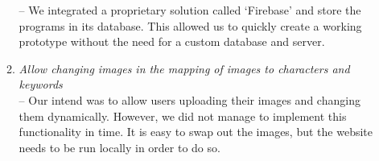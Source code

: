 \begin{enumerate}
\begin{enumerate}[label=(\alph*)]
     -- We integrated a proprietary solution called `Firebase' and store the programs in its database. This allowed us to quickly create a working
     prototype without the need for a custom database and server.
	 \item \textit{Allow changing images in the mapping of images to characters and keywords} \\
     -- Our intend was to allow users uploading their images and changing them dynamically. However, we did not manage to implement this functionality
     in time. It is easy to swap out the images, but the website needs to be run locally in order to do so.
   \end{enumerate}
\end{enumerate}